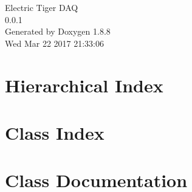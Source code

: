 \documentclass[twoside]{book}
\newcommand{\+}{\discretionary{\mbox{\scriptsize$\hookleftarrow$}}{}{}}
\newcommand{\clearemptydoublepage}{%
  \newpage{\pagestyle{empty}\cleardoublepage}%
}
\begin{document}
\hypersetup{pageanchor=false,
             bookmarks=true,
             bookmarksnumbered=true,
             pdfencoding=unicode
            }
\begin{titlepage}
\vspace*{7cm}
\begin{center}%
{\Large Electric Tiger D\+A\+Q \\[1ex]\large 0.\+0.\+1 }\\
\vspace*{1cm}
{\large Generated by Doxygen 1.8.8}\\
\vspace*{0.5cm}
{\small Wed Mar 22 2017 21:33:06}\\
\end{center}
\end{titlepage}
\clearemptydoublepage
\tableofcontents
\clearemptydoublepage
{}
\hypersetup{pageanchor=true}

\chapter{Hierarchical Index}

\chapter{Class Index}

\chapter{Class Documentation}




































\newpage
{}
{}
\printindex
\end{document}
